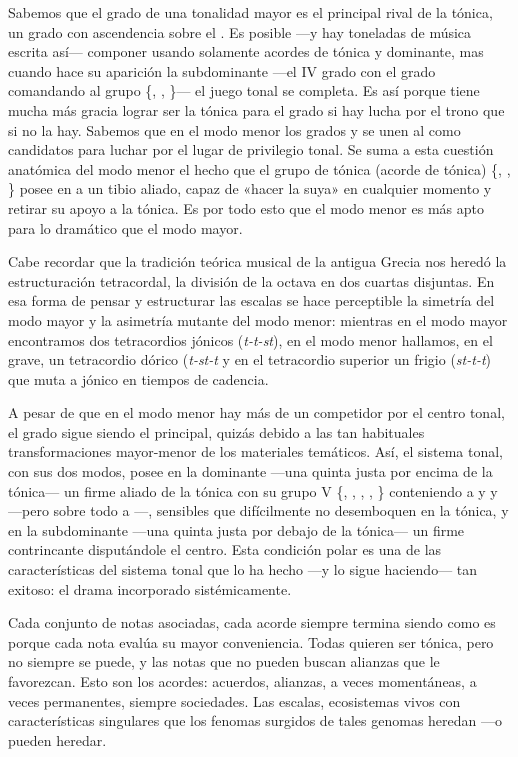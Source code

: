 \documentclass[a4paper,11pt]{article}
\begin{document}
\begin{multicols}{2}
Sabemos que el  grado de una tonalidad mayor es el principal rival de la tónica, un grado con ascendencia sobre el . Es posible ---y hay toneladas de música escrita así--- componer usando solamente acordes de tónica y dominante, mas cuando hace su aparición la subdominante ---el IV grado con el  grado comandando al grupo \{, , \}--- el juego tonal se completa. Es así porque tiene mucha más gracia lograr ser la tónica para el  grado si hay lucha por el trono que si no la hay. Sabemos que en el modo menor los grados  y  se unen al  como candidatos para luchar por el lugar de privilegio tonal. Se suma a esta cuestión anatómica del modo menor el hecho que el grupo de tónica (acorde de tónica) \{, , \} posee en  a un tibio aliado, capaz de «hacer la suya» en cualquier momento y retirar su apoyo a la tónica. Es por todo esto que el modo menor es más apto para lo dramático que el modo mayor.

Cabe recordar que la tradición teórica musical de la antigua Grecia nos heredó la estructuración tetracordal, la división de la octava en dos cuartas disjuntas. En esa forma de pensar y estructurar las escalas se hace perceptible la simetría del modo mayor y la asimetría mutante del modo menor: mientras en el modo mayor encontramos dos tetracordios jónicos (\emph{t-t-st}), en el modo menor hallamos, en el grave, un tetracordio dórico (\emph{t-st-t} y en el tetracordio superior un frigio (\emph{st-t-t}) que muta a jónico en tiempos de cadencia.

A pesar de que en el modo menor hay más de un competidor por el centro tonal, el  grado sigue siendo el principal, quizás debido a las tan habituales transformaciones mayor-menor de los materiales temáticos. Así, el sistema tonal, con sus dos modos, posee en la dominante ---una quinta justa por encima de la tónica--- un firme aliado de la tónica con su grupo V \{, , , , \} conteniendo a  y  y  ---pero sobre todo a ---, sensibles que difícilmente no desemboquen en la tónica, y en la subdominante ---una quinta justa por debajo de la tónica--- un firme contrincante disputándole el centro. Esta condición polar es una de las características del sistema tonal que lo ha hecho ---y lo sigue haciendo--- tan exitoso: el drama incorporado sistémicamente.

Cada conjunto de notas asociadas, cada acorde siempre termina siendo como es porque cada nota evalúa su mayor conveniencia. Todas quieren ser tónica, pero no siempre se puede, y las notas que no pueden buscan alianzas que le favorezcan. Esto son los acordes: acuerdos, alianzas, a veces momentáneas, a veces permanentes, siempre sociedades. Las escalas, ecosistemas vivos con características singulares que los fenomas surgidos de tales genomas heredan ---o pueden heredar.


\end{multicols}
\end{document}

